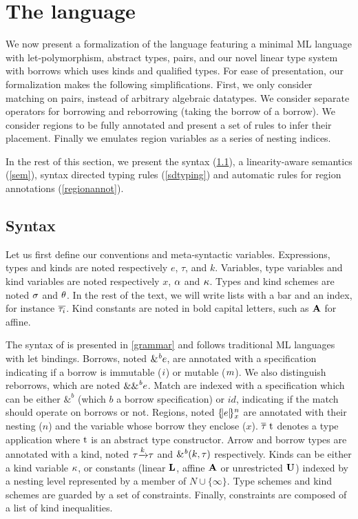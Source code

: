 \section{The \lang language}

We now present a formalization of the \lang language featuring
a minimal ML language with let-polymorphism, abstract types, pairs, and our novel
linear type system with borrows which uses kinds and qualified types.
For ease of presentation,
our formalization makes the following simplifications.
First, we only consider matching on pairs, instead of arbitrary algebraic
datatypes. We consider separate operators for borrowing and reborrowing (taking
the borrow of a borrow). We consider regions to be fully annotated
and present a set of rules to infer their placement.
Finally we emulates region variables
as a series of nesting indices.

In the rest of this section, we present the syntax (\cref{syntax}),
a linearity-aware semantics (\cref{sem}), syntax directed typing rules
(\cref{sdtyping}) and automatic rules for region annotations (\cref{regionannot}).

\subsection{Syntax}
\label{syntax}

Let us first define our conventions and meta-syntactic variables.
Expressions, types and kinds are noted respectively $e$, $\tau$, and $k$.
Variables, type variables and kind variables are noted
respectively $x$, $\tvar$ and $\kvar$. Types and kind schemes
are noted $\schm$ and $\kschm$.
In the rest of the text, we will write lists with a bar and an index, for
instance $\Multi[i]{\tau}$.
Kind constants are noted in bold capital letters, such as $\kaff$ for affine.

The syntax of \lang is presented in \cref{grammar} and follows
traditional ML languages with let bindings.
Borrows, noted $\borrow{e}$, are annotated with a specification indicating
if a borrow is immutable ($\IBORROW$) or mutable ($\MBORROW$).
We also distinguish reborrows, which are noted $\reborrow{e}$.
Match are indexed with a specification which can be either $\&^b$
(which $b$ a borrow specification) or $id$, indicating if the match
should operate on borrows or not.
Regions, noted $\region{x}{e}$ are annotated with their nesting ($n$)
and the variable whose borrow they enclose ($x$).
%
$\tapp{t}{\Multi{\tau}}$ denotes a type application where
$\T t$ is an abstract type constructor.
Arrow and borrow types are annotated with a kind, noted $\tau \tarr{k} \tau$
and $\borrowty{k}{\tau}$ respectively.
%
Kinds can be either a kind variable $\kvar$, or constants
(linear $\klin$, affine $\kaff$ or unrestricted $\kun$) indexed
by a nesting level represented by a member of $N \cup \{\infty\}$.
Type schemes and kind schemes are guarded by a set of constraints.
%
Finally, constraints are composed of a list of kind inequalities.


